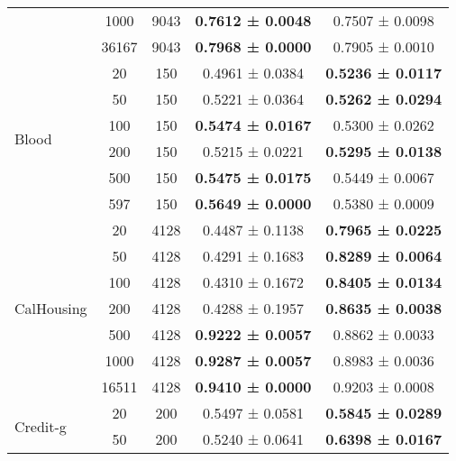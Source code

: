 \begin{table}[H]
{\begin{tabular}[H]{@{}lcccc@{}}
                              & 1000        & 9043 & \textbf{0.7612 ± 0.0048} & 0.7507 ± 0.0098          \\
                              & 36167       & 9043 & \textbf{0.7968 ± 0.0000} & 0.7905 ± 0.0010          \\
                              \midrule
\multirow{6}{*}{Blood}        & 20          & 150  & 0.4961 ± 0.0384          & \textbf{0.5236 ± 0.0117} \\
                              & 50          & 150  & 0.5221 ± 0.0364          & \textbf{0.5262 ± 0.0294} \\
                              & 100         & 150  & \textbf{0.5474 ± 0.0167} & 0.5300 ± 0.0262          \\
                              & 200         & 150  & 0.5215 ± 0.0221          & \textbf{0.5295 ± 0.0138} \\
                              & 500         & 150  & \textbf{0.5475 ± 0.0175} & 0.5449 ± 0.0067          \\
                              & 597         & 150  & \textbf{0.5649 ± 0.0000} & 0.5380 ± 0.0009          \\
                              \midrule
\multirow{7}{*}{CalHousing}   & 20          & 4128 & 0.4487 ± 0.1138          & \textbf{0.7965 ± 0.0225} \\
                              & 50          & 4128 & 0.4291 ± 0.1683          & \textbf{0.8289 ± 0.0064} \\
                              & 100         & 4128 & 0.4310 ± 0.1672          & \textbf{0.8405 ± 0.0134} \\
                              & 200         & 4128 & 0.4288 ± 0.1957          & \textbf{0.8635 ± 0.0038} \\
                              & 500         & 4128 & \textbf{0.9222 ± 0.0057} & 0.8862 ± 0.0033          \\
                              & 1000        & 4128 & \textbf{0.9287 ± 0.0057} & 0.8983 ± 0.0036          \\
                              & 16511       & 4128 & \textbf{0.9410 ± 0.0000} & 0.9203 ± 0.0008          \\
                              \midrule
\multirow{6}{*}{Credit-g}     & 20          & 200  & 0.5497 ± 0.0581          & \textbf{0.5845 ± 0.0289} \\
                              & 50          & 200  & 0.5240 ± 0.0641          & \textbf{0.6398 ± 0.0167} \\

\end{tabular}}
\end{table}
